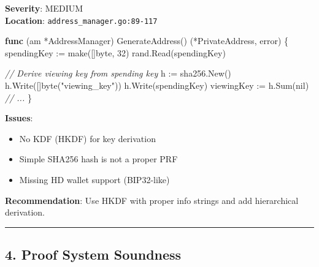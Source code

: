 \documentclass[
]{article}
\newenvironment{Shaded}{}{}
\newcommand{\BuiltInTok}[1]{\textcolor[rgb]{0.00,0.50,0.00}{#1}}
\newcommand{\CommentTok}[1]{\textcolor[rgb]{0.38,0.63,0.69}{\textit{#1}}}
\newcommand{\DataTypeTok}[1]{\textcolor[rgb]{0.56,0.13,0.00}{#1}}
\newcommand{\DecValTok}[1]{\textcolor[rgb]{0.25,0.63,0.44}{#1}}
\newcommand{\KeywordTok}[1]{\textcolor[rgb]{0.00,0.44,0.13}{\textbf{#1}}}
\newcommand{\NormalTok}[1]{#1}
\newcommand{\OperatorTok}[1]{\textcolor[rgb]{0.40,0.40,0.40}{#1}}
\newcommand{\OtherTok}[1]{\textcolor[rgb]{0.00,0.44,0.13}{#1}}
\newcommand{\StringTok}[1]{\textcolor[rgb]{0.25,0.44,0.63}{#1}}
\providecommand{\tightlist}{%
  \setlength{\itemsep}{0pt}\setlength{\parskip}{0pt}}
\begin{document}
\textbf{Severity}: MEDIUM\\
\textbf{Location}: \texttt{address\_manager.go:89-117}

\begin{Shaded}
\begin{Highlighting}[]
\KeywordTok{func} \OperatorTok{(}\NormalTok{am }\OperatorTok{*}\NormalTok{AddressManager}\OperatorTok{)}\NormalTok{ GenerateAddress}\OperatorTok{()} \OperatorTok{(*}\NormalTok{PrivateAddress}\OperatorTok{,} \DataTypeTok{error}\OperatorTok{)} \OperatorTok{\{}
\NormalTok{    spendingKey }\OperatorTok{:=} \BuiltInTok{make}\OperatorTok{([]}\DataTypeTok{byte}\OperatorTok{,} \DecValTok{32}\OperatorTok{)}
\NormalTok{    rand}\OperatorTok{.}\NormalTok{Read}\OperatorTok{(}\NormalTok{spendingKey}\OperatorTok{)}
    
    \CommentTok{// Derive viewing key from spending key}
\NormalTok{    h }\OperatorTok{:=}\NormalTok{ sha256}\OperatorTok{.}\NormalTok{New}\OperatorTok{()}
\NormalTok{    h}\OperatorTok{.}\NormalTok{Write}\OperatorTok{([]}\DataTypeTok{byte}\OperatorTok{(}\StringTok{"viewing\_key"}\OperatorTok{))}
\NormalTok{    h}\OperatorTok{.}\NormalTok{Write}\OperatorTok{(}\NormalTok{spendingKey}\OperatorTok{)}
\NormalTok{    viewingKey }\OperatorTok{:=}\NormalTok{ h}\OperatorTok{.}\NormalTok{Sum}\OperatorTok{(}\OtherTok{nil}\OperatorTok{)}
    \CommentTok{// ...}
\OperatorTok{\}}
\end{Highlighting}
\end{Shaded}

\textbf{Issues}:

\begin{itemize}
\tightlist
\item
  No KDF (HKDF) for key derivation
\item
  Simple SHA256 hash is not a proper PRF
\item
  Missing HD wallet support (BIP32-like)
\end{itemize}

\textbf{Recommendation}: Use HKDF with proper info strings and add
hierarchical derivation.

\begin{center}\rule{0.5\linewidth}{0.5pt}\end{center}

\subsection{4. Proof System Soundness}\label{4-proof-system-soundness}
\end{document}
